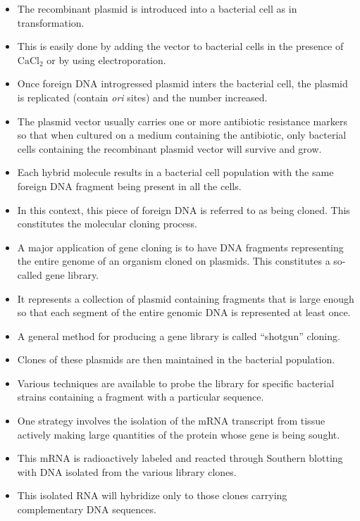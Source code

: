 \documentclass[11pt,dvipsnames,ignorenonframetext,aspectratio=169]{beamer}
\providecommand{\tightlist}{%
  \setlength{\itemsep}{0pt}\setlength{\parskip}{0pt}}
\begin{document}
\begin{frame}{}
\protect\hypertarget{section-21}{}
\begin{itemize}
\tightlist
\item
  The recombinant plasmid is introduced into a bacterial cell as in
  transformation.
\item
  This is easily done by adding the vector to bacterial cells in the
  presence of \(\mathrm{CaCl_2}\) or by using electroporation.
\item
  Once foreign DNA introgressed plasmid inters the bacterial cell, the
  plasmid is replicated (contain \emph{ori} sites) and the number
  increased.
\item
  The plasmid vector usually carries one or more antibiotic resistance
  markers so that when cultured on a medium containing the antibiotic,
  only bacterial cells containing the recombinant plasmid vector will
  survive and grow.
\item
  Each hybrid molecule results in a bacterial cell population with the
  same foreign DNA fragment being present in all the cells.
\item
  In this context, this piece of foreign DNA is referred to as being
  cloned. This constitutes the molecular cloning process.
\end{itemize}
\end{frame}

\begin{frame}{}
\protect\hypertarget{section-22}{}
\begin{itemize}
\tightlist
\item
  A major application of gene cloning is to have DNA fragments
  representing the entire genome of an organism cloned on plasmids. This
  constitutes a so-called gene library.
\item
  It represents a collection of plasmid containing fragments that is
  large enough so that each segment of the entire genomic DNA is
  represented at least once.
\item
  A general method for producing a gene library is called ``shotgun''
  cloning.
\item
  Clones of these plasmids are then maintained in the bacterial
  population.
\item
  Various techniques are available to probe the library for specific
  bacterial strains containing a fragment with a particular sequence.
\item
  One strategy involves the isolation of the mRNA transcript from tissue
  actively making large quantities of the protein whose gene is being
  sought.
\item
  This mRNA is radioactively labeled and reacted through Southern
  blotting with DNA isolated from the various library clones.
\item
  This isolated RNA will hybridize only to those clones carrying
  complementary DNA sequences.
\end{itemize}
\end{frame}
\end{document}
